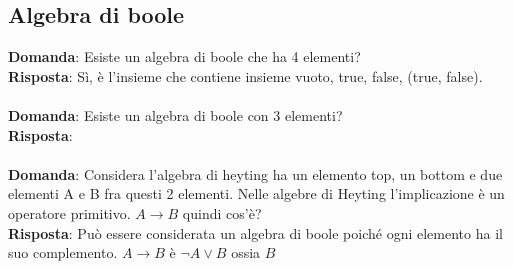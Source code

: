 \documentclass{article}
\begin{document}
\subsection{Algebra di boole}
\textbf{Domanda}: Esiste un algebra di boole che ha 4 elementi? \\
\textbf{Risposta}: Sì, è l'insieme che contiene insieme vuoto, true, false, (true, false). \\ \\
\textbf{Domanda}: Esiste un algebra di boole con 3 elementi? \\
\textbf{Risposta}: \\ \\
\textbf{Domanda}: Considera l'algebra di heyting ha un elemento top, un bottom e due elementi A e B fra questi 2 elementi. Nelle algebre di Heyting l'implicazione è un operatore primitivo. $A \to B$ quindi cos'è? \\
\textbf{Risposta}: Può essere considerata un algebra di boole poiché ogni elemento ha il suo complemento. $A \to B$ è $\lnot A \lor B$ ossia $B$\\ \\
\end{document}
